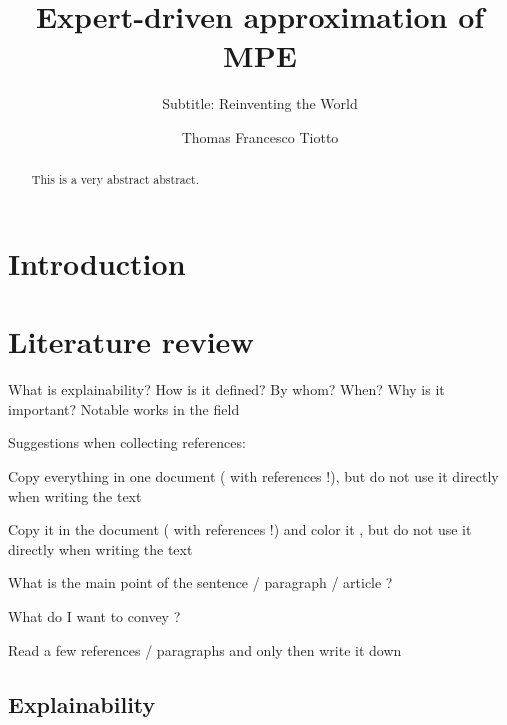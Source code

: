 \documentclass[mscthesis]{usiinfthesis}
\title{Expert-driven approximation of MPE} %
\subtitle{Subtitle: Reinventing the World} %
\author{Thomas Francesco Tiotto} %
\begin{document}
\maketitle %

\frontmatter %

\begin{abstract}
This is a very abstract abstract. 

\lipsum
\end{abstract}

\begin{acknowledgements}
\lipsum 
\end{acknowledgements}

\tableofcontents 
\listoffigures %
\listoftables %

\mainmatter


\chapter{Introduction}\label{chap:introduction}




 



\chapter{Literature review}\label{chap:literaturereview}
What is explainability?
How is it defined?  By whom?  When?
Why is it important?
Notable works in the field

Suggestions  when  collecting  references:

Copy  everything  in  one  document  (  with  references  !),  but  do  not  use it  directly  when  writing  the  text 
 
Copy it in  the  document  (  with  references  !)  and  color it  ,  but  do  not  use it  directly  when  writing  the  text   

What  is  the    main  point  of  the  sentence  /  paragraph  /  article  ?  

What    do I  want  to  convey  ?  

Read a  few  references  /  paragraphs  and  only  then  write  it  down

\section{Explainability}
\end{document}
